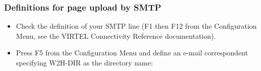 \documentclass[letterpaper,10pt,english]{sphinxmanual}
\begin{document}
\subsubsection{Definitions for page upload by SMTP}
\label{\detokenize{audit_operations_ and_performance:definitions-for-page-upload-by-smtp}}\label{\detokenize{audit_operations_ and_performance:index-70}}\begin{itemize}
\item {} 
Check the definition of your SMTP line (F1 then F12 from the Configuration Menu, see the VIRTEL Connectivity Reference documentation).

\item {} 
Press F5 from the Configuration Menu and define an e-mail correspondent specifying W2H-DIR as the directory name:

\end{itemize}
\end{document}
